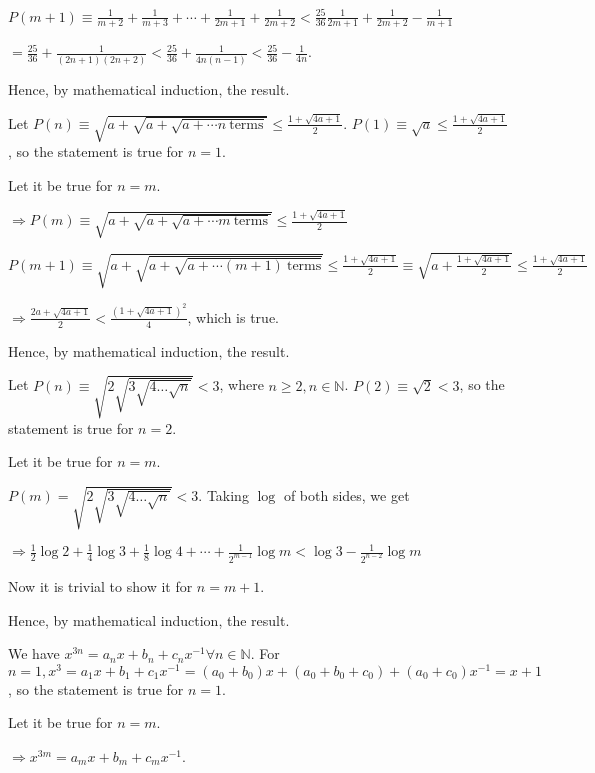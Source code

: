   $P(m + 1)\equiv \frac{1}{m + 2} + \frac{1}{m + 3} + \cdots + \frac{1}{2m + 1} + \frac{1}{2m + 2} < \frac{25}{36}
  \frac{1}{2m + 1} + \frac{1}{2m + 2} - \frac{1}{m + 1}$

  $= \frac{25}{36} + \frac{1}{(2n + 1)(2n + 2)} < \frac{25}{36} + \frac{1}{4n(n - 1)} < \frac{25}{36} -
  \frac{1}{4n}$.

  Hence, by mathematical induction, the result.
\item Let $P(n)\equiv\sqrt{a + \sqrt{a + \sqrt{a + \cdots n~\text{terms}}}}\leq \frac{1 + \sqrt{4a +
    1}}{2}$. $P(1)\equiv \sqrt{a} \leq \frac{1 + \sqrt{4a + 1}}{2}$, so the statement is true for $n = 1$.

  Let it be true for $n = m$.

  $\Rightarrow P(m) \equiv\sqrt{a + \sqrt{a + \sqrt{a + \cdots m~\text{terms}}}}\leq \frac{1 + \sqrt{4a +
      1}}{2}$

  $P(m + 1)\equiv \sqrt{a + \sqrt{a + \sqrt{a + \cdots (m + 1)~\text{terms}}}}\leq \frac{1 + \sqrt{4a +
    1}}{2}\equiv \sqrt{a + \frac{1 + \sqrt{4a + 1}}{2}}\leq \frac{1 + \sqrt{4a + 1}}{2}$

  $\Rightarrow \frac{2a + \sqrt{4a + 1}}{2} < \frac{(1 + \sqrt{4a + 1})^2}{4}$, which is true.

  Hence, by mathematical induction, the result.
\item Let $P(n)\equiv\sqrt{2\sqrt{3\sqrt{4\ldots\sqrt{n}}}} < 3$, where $n\geq 2,
  n\in\mathbb{N}$. $P(2)\equiv\sqrt{2} < 3$, so the statement is true for $n = 2$.

  Let it be true for $n = m$.

  $P(m) = \sqrt{2\sqrt{3\sqrt{4\ldots\sqrt{n}}}} < 3$. Taking $\log$ of both sides, we get

  $\Rightarrow \frac{1}{2}\log 2 + \frac{1}{4}\log 3 + \frac{1}{8}\log 4 + \cdots + \frac{1}{2^{m -
      1}}\log m < \log 3 - \frac{1}{2^{n - 2}}\log m$

  Now it is trivial to show it for $n = m + 1$.

  Hence, by mathematical induction, the result.
\item We have $x^{3n} = a_nx + b_n + c_nx^{-1}\forall n\in\mathbb{N}$. For $n = 1, x^3 = a_1x + b_1 +
  c_1x^{-1} = (a_0 + b_0)x + (a_0 + b_0 + c_0) + (a_0 + c_0)x^{-1} = x + 1$, so the statement is true for $n
  = 1$.

  Let it be true for $n = m$.

  $\Rightarrow x^{3m} = a_mx + b_m + c_mx^{-1}$.


